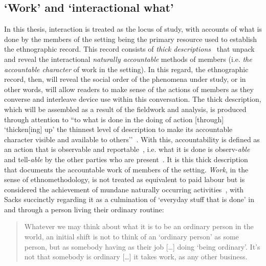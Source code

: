 \subsection{`Work' and `interactional what'}\label{sec:background approach em work}
In this thesis, interaction is treated as the locus of study, with accounts of what is done by the members of the setting being the primary resource used to establish the ethnographic record.
This record consists of \textit{thick descriptions}~\citep{Geertz1973a} that unpack and reveal the interactional \textit{naturally accountable} methods of members (i.e. \textit{the accountable character} of work in the setting).
In this regard, the ethnographic record, then, will reveal the social order of the phenomena under study, or in other words, will allow readers to make sense of the actions of members as they converse and interleave device use within this conversation.
The thick description, which will be assembled as a result of the fieldwork and analysis, is produced through attention to ``to what is done in the doing of action [through] `thicken[ing] up’ the thinnest level of description to make its accountable character visible and available to others''~\citep[pp 117--118]{Crabtree2012}.
With this, accountability is defined as an action that is observable and reportable~\citep{Garfinkel1967}, i.e. what it is done is observ-\textit{able} and tell-\textit{able} by the other parties who are present~\citep[pp 117--118]{Crabtree2012}.
It is this thick description that documents the accountable work of members of the setting.
\textit{Work}, in the sense of ethnomethodology, is not treated as equivalent to paid labour but is considered the achievement of mundane naturally occurring activities~\citep{Schmidt2010,Crabtree2009,Crabtree2006,Button2012}, with Sacks succinctly regarding it as a culmination of `everyday stuff that is done' in and through a person living their ordinary routine:
\begin{quote}
    Whatever we may think about what it is to be an ordinary person in the world, an initial shift is not to think of an ‘ordinary person’ as some person, but as somebody having as their job [\ldots] doing ‘being ordinary’.
    It's not that somebody is ordinary [\ldots] it takes work, as any other business.
\end{quote}

